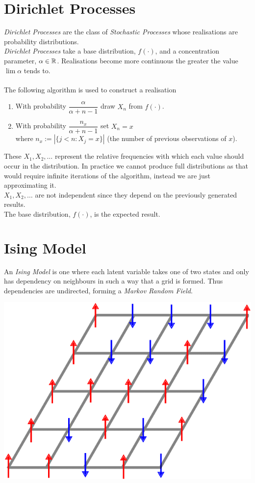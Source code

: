 \documentclass[11pt,a4paper]{article}
\begin{document}
\section{Dirichlet Processes}
\textit{Dirichlet Processes} are the class of \textit{Stochastic Processes} whose realisations are probability distributions.\\
\textit{Dirichlet Processes} take a base distribution, $f(\cdot)$, and a concentration parameter, $\alpha\in\mathbb{R}$. Realisations become more continuous the greater the value $\lim\alpha$ tends to.\\
\\
The following algorithm is used to construct a realisation
\begin{enumerate}
	\item With probability $\dfrac\alpha{\alpha+n-1}$ draw $X_n$ from $f(\cdot)$.
	\item With probability $\dfrac{n_x}{\alpha+n-1}$ set $X_n=x$\\
	 where $n_x:=|\{j<n:X_j=x\}|$ (\ie the number of previous observations of $x$).
\end{enumerate}
These $X_1,X_2,\dots$ represent the relative frequencies with which each value should occur in the distribution. In practice we cannot produce full distributions as that would require infinite iterations of the algorithm, instead we are just approximating it.\\
\nb $X_1,X_2,\dots$ are not independent since they depend on the previously generated results.\\
\nb The base distribution, $f(\cdot)$, is the expected result.

\section{Ising Model}
An \textit{Ising Model} is one where each latent variable takes one of two states and only has dependency on neighbours in such a way that a grid is formed. Thus dependencies are undirected, forming a \textit{Markov Random Field}.
\begin{center}\includegraphics[scale=.2]{img/ising.png}\end{center}
\end{document}
